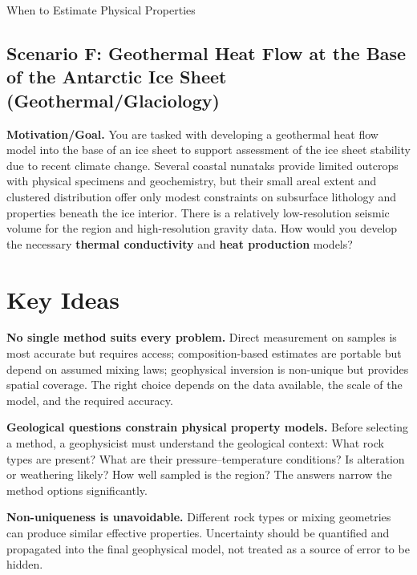 \begin{activity}{When to Estimate Physical Properties}
\subsection*{Scenario F: Geothermal Heat Flow at the Base of the Antarctic Ice Sheet (Geothermal/Glaciology)}
\noindent\textbf{Motivation/Goal.} You are tasked with developing a geothermal heat flow model into the base of an ice sheet to support assessment of the ice sheet stability due to recent climate change. Several coastal nunataks provide limited outcrops with physical specimens and geochemistry, but their small areal extent and clustered distribution offer only modest constraints on subsurface lithology and properties beneath the ice interior.  There is a relatively low-resolution seismic volume for the region and high-resolution gravity data.  How would you develop the necessary \textbf{thermal conductivity} and \textbf{heat production} models?

\yourplan{}

\clearpage
\section*{Key Ideas}

\textbf{No single method suits every problem.} Direct measurement on samples is most accurate but requires access; composition-based estimates are portable but depend on assumed mixing laws; geophysical inversion is non-unique but provides spatial coverage. The right choice depends on the data available, the scale of the model, and the required accuracy.

\textbf{Geological questions constrain physical property models.} Before selecting a method, a geophysicist must understand the geological context: What rock types are present? What are their pressure--temperature conditions? Is alteration or weathering likely? How well sampled is the region? The answers narrow the method options significantly.

\textbf{Non-uniqueness is unavoidable.} Different rock types or mixing geometries can produce similar effective properties. Uncertainty should be quantified and propagated into the final geophysical model, not treated as a source of error to be hidden.

\end{activity}
